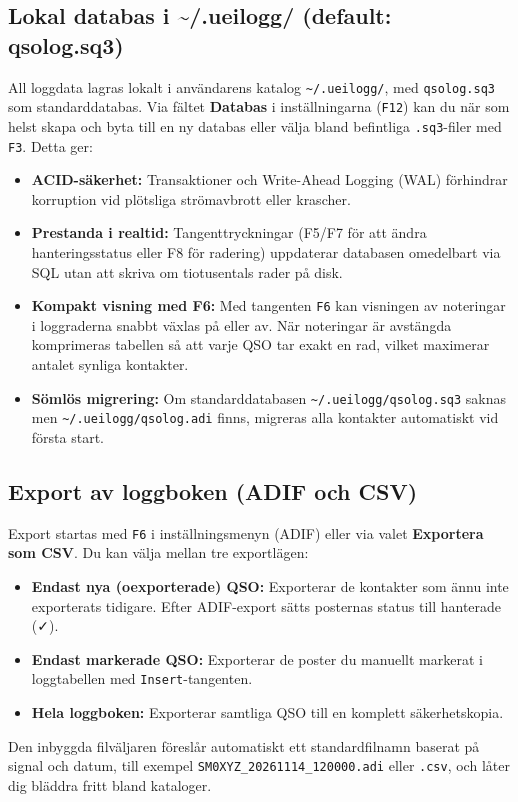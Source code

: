 \documentclass[11pt,a4paper]{article}
\begin{document}
\subsection{Lokal databas i \textasciitilde/.ueilogg/ (default: qsolog.sq3)}
All loggdata lagras lokalt i användarens katalog \texttt{\textasciitilde/.ueilogg/}, med \texttt{qsolog.sq3} som standarddatabas. Via fältet \textbf{Databas} i inställningarna (\texttt{F12}) kan du när som helst skapa och byta till en ny databas eller välja bland befintliga \texttt{.sq3}-filer med \texttt{F3}. Detta ger:
\begin{itemize}
    \item \textbf{ACID-säkerhet:} Transaktioner och Write-Ahead Logging (WAL) förhindrar korruption vid plötsliga strömavbrott eller krascher.
    \item \textbf{Prestanda i realtid:} Tangenttryckningar (F5/F7 för att ändra hanteringsstatus eller F8 för radering) uppdaterar databasen omedelbart via SQL utan att skriva om tiotusentals rader på disk.
    \item \textbf{Kompakt visning med F6:} Med tangenten \texttt{F6} kan visningen av noteringar i loggraderna snabbt växlas på eller av. När noteringar är avstängda komprimeras tabellen så att varje QSO tar exakt en rad, vilket maximerar antalet synliga kontakter.
    \item \textbf{Sömlös migrering:} Om standarddatabasen \texttt{\textasciitilde/.ueilogg/qsolog.sq3} saknas men \texttt{\textasciitilde/.ueilogg/qsolog.adi} finns, migreras alla kontakter automatiskt vid första start.
\end{itemize}

\subsection{Export av loggboken (ADIF och CSV)}
Export startas med \texttt{F6} i inställningsmenyn (ADIF) eller via valet \textbf{Exportera som CSV}. Du kan välja mellan tre exportlägen:
\begin{itemize}
    \item \textbf{Endast nya (oexporterade) QSO:} Exporterar de kontakter som ännu inte exporterats tidigare. Efter ADIF-export sätts posternas status till hanterade (✓).
    \item \textbf{Endast markerade QSO:} Exporterar de poster du manuellt markerat i loggtabellen med \texttt{Insert}-tangenten.
    \item \textbf{Hela loggboken:} Exporterar samtliga QSO till en komplett säkerhetskopia.
\end{itemize}
Den inbyggda filväljaren föreslår automatiskt ett standardfilnamn baserat på signal och datum, till exempel \texttt{SM0XYZ\_20261114\_120000.adi} eller \texttt{.csv}, och låter dig bläddra fritt bland kataloger.
\end{document}
